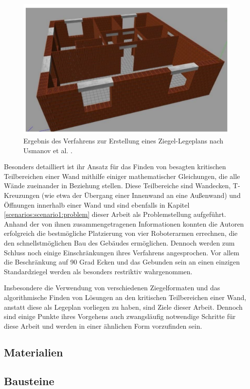 \begin{figure}[ht]
    \centering
    \includegraphics[width=0.6\columnwidth]{fig/sustainability-13-03905-g004.png}
    \caption{Ergebnis des Verfahrens zur Erstellung eines Ziegel-Legeplans nach Usmanov et al. \cite{Usmanov2021}.}
    \label{fig:usmanov}
\end{figure}

Besonders detailliert ist ihr Ansatz für das Finden von besagten kritischen Teilbereichen einer Wand mithilfe einiger mathematischer Gleichungen, die alle Wände zueinander in Beziehung stellen.
Diese Teilbereiche sind Wandecken, T-Kreuzungen (wie etwa der Übergang einer Innenwand an eine Außenwand) und Öffnungen innerhalb einer Wand und sind ebenfalls in Kapitel \ref{scenarios:scenario1:problem} dieser Arbeit als Problemstellung aufgeführt.
Anhand der von ihnen zusammengetragenen Informationen konnten die Autoren erfolgreich die bestmögliche Platzierung von vier Roboterarmen errechnen, die den schnellstmöglichen Bau des Gebäudes ermöglichen.
Dennoch werden zum Schluss noch einige Einschränkungen ihres Verfahrens angesprochen.
Vor allem die Beschränkung auf 90 Grad Ecken und das Gebunden sein an einen einzigen Standardziegel werden als besonders restriktiv wahrgenommen.

Insbesondere die Verwendung von verschiedenen Ziegelformaten und das algorithmische Finden von Lösungen an den kritischen Teilbereichen einer Wand, anstatt diese als Legeplan vorliegen zu haben, sind Ziele dieser Arbeit.
Dennoch sind einige Punkte ihres Vorgehens auch zwangsläufig notwendige Schritte für diese Arbeit und werden in einer ähnlichen Form vorzufinden sein.

\subsection{Materialien}
\subsection{Bausteine}
